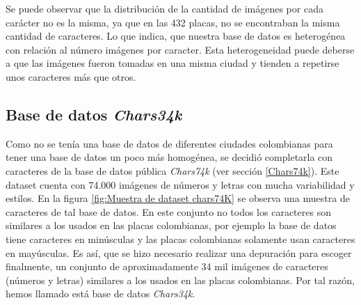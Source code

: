 Se puede observar que la distribución de la cantidad de imágenes por cada carácter no es la misma, ya que en las 432 placas, no se encontraban la misma cantidad de caracteres. Lo que indica, que nuestra base de datos es heterogénea con relación al número imágenes por caracter. Esta heterogeneidad puede deberse a que las imágenes fueron tomadas en una misma ciudad y tienden a repetirse unos caracteres más que otros.  



\subsection{Base de datos \textit{Chars34k}} \label{Chars34k}

Como no se tenía una base de datos de diferentes ciudades colombianas para tener una base de datos un poco más homogénea, se decidió completarla con caracteres de la base de datos pública \textit{Chars74k} (ver sección \ref{Chars74k}). Este dataset cuenta con 74.000 imágenes de números y letras con mucha variabilidad y estilos. En la figura \ref{fig:Muestra de dataset chars74K} se observa una muestra de caracteres de tal base de datos. En este conjunto no todos los caracteres son similares a los usados en las placas colombianas, por ejemplo la base de datos tiene caracteres en minúsculas y las placas colombianas solamente usan caracteres en mayúsculas. Es así, que se hizo necesario realizar una depuración para escoger finalmente, un conjunto de aproximadamente 34 mil imágenes de caracteres (números y letras)  similares a los usados en las placas colombianas. Por tal razón, hemos llamado está base de datos \textit{Chars34k}.     

